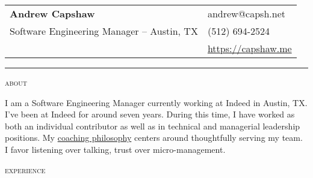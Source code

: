 \documentclass[11pt]{amsart}
\begin{document}
\thispagestyle{empty}

\begin{tabularx}{\textwidth}{@{}Xl@{}}
 \textbf{Andrew Capshaw} & andrew@capsh.net \\
 Software Engineering Manager – Austin, TX & (512) 694-2524 \\
& \href{https://capshaw.me}{https://capshaw.me} \\
\end{tabularx}
\bigskip

\bigskip
\hrule depth 0.5pt

\begingroup
\setlength{\tabcolsep}{10pt} %
\renewcommand{\arraystretch}{1.5} %

\bigskip
\textsc{about}

I am a Software Engineering Manager currently working at Indeed in Austin, TX. I've been at Indeed for around seven years. During this time, I have worked as both an individual contributor as well as in technical and managerial leadership positions. My \href{https://capshaw.me/posts/19/}{coaching philosophy} centers around thoughtfully serving my team. I favor listening over talking, trust over micro-management.

\bigskip
\textsc{experience}
\end{document}

